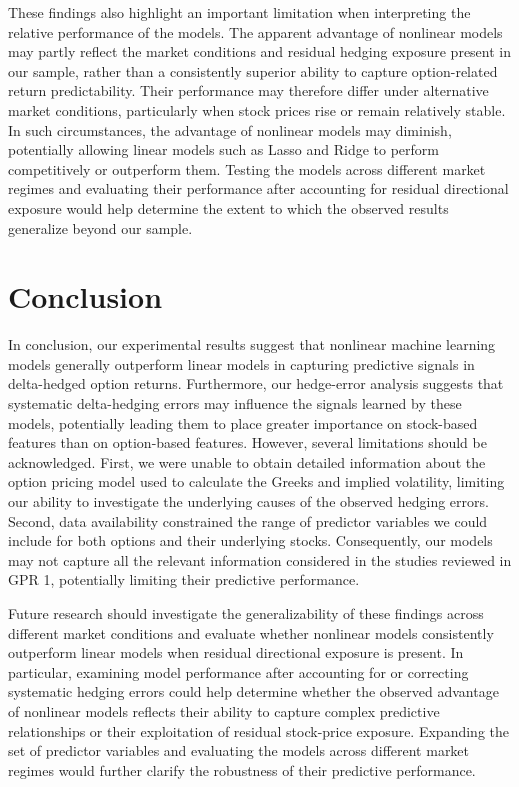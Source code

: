 \documentclass[oneside, 12pt]{article}
\newcommand*{\1}{\text{\scalebox{1.1}{\usefont{U}{bbold}{m}{n}1}}}
\begin{document}
These findings also highlight an important limitation when interpreting the relative performance of the models. The apparent advantage of nonlinear models may partly reflect the market conditions and residual hedging exposure present in our sample, rather than a consistently superior ability to capture option-related return predictability. Their performance may therefore differ under alternative market conditions, particularly when stock prices rise or remain relatively stable. In such circumstances, the advantage of nonlinear models may diminish, potentially allowing linear models such as Lasso and Ridge to perform competitively or outperform them. Testing the models across different market regimes and evaluating their performance after accounting for residual directional exposure would help determine the extent to which the observed results generalize beyond our sample.


\section{Conclusion}
In conclusion, our experimental results suggest that nonlinear machine learning models generally outperform linear models in capturing predictive signals in delta-hedged option returns. Furthermore, our hedge-error analysis suggests that systematic delta-hedging errors may influence the signals learned by these models, potentially leading them to place greater importance on stock-based features than on option-based features. However, several limitations should be acknowledged. First, we were unable to obtain detailed information about the option pricing model used to calculate the Greeks and implied volatility, limiting our ability to investigate the underlying causes of the observed hedging errors. Second, data availability constrained the range of predictor variables we could include for both options and their underlying stocks. Consequently, our models may not capture all the relevant information considered in the studies reviewed in GPR 1, potentially limiting their predictive performance. \newline

Future research should investigate the generalizability of these findings across different market conditions and evaluate whether nonlinear models consistently outperform linear models when residual directional exposure is present. In particular, examining model performance after accounting for or correcting systematic hedging errors could help determine whether the observed advantage of nonlinear models reflects their ability to capture complex predictive relationships or their exploitation of residual stock-price exposure. Expanding the set of predictor variables and evaluating the models across different market regimes would further clarify the robustness of their predictive performance.
\end{document}
